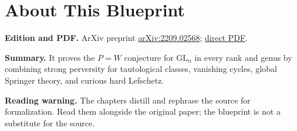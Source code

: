 

\chapter*{About This Blueprint}
\label{pw-conjecture-gl-n-about}


\textbf{Edition and PDF.} ArXiv preprint \href{https://arxiv.org/abs/2209.02568}{arXiv:2209.02568}; \href{https://arxiv.org/pdf/2209.02568}{direct PDF}.

\textbf{Summary.} It proves the $P=W$ conjecture for $\mathrm{GL}_n$ in every rank and genus by combining strong perversity for tautological classes, vanishing cycles, global Springer theory, and curious hard Lefschetz.

\textbf{Reading warning.} The chapters distill and rephrase the source for formalization. Read them alongside the original paper; the blueprint is not a substitute for the source.











